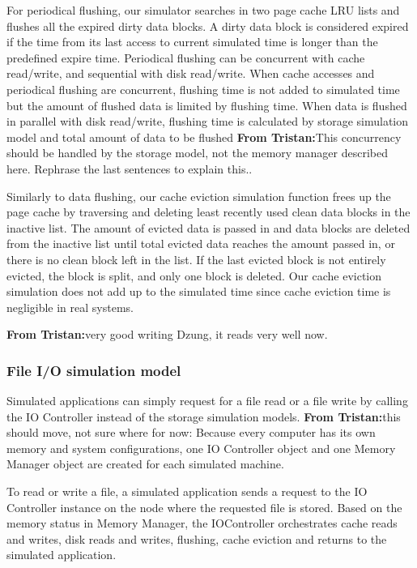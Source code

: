 \documentclass[conference]{IEEEtran}
\newcommand{\tristan}[1]{\color{orange}\textbf{From Tristan:}#1\color{black}}
\begin{document}
			For periodical flushing, our simulator searches in two page cache 
			LRU lists and flushes all the expired dirty data blocks. 
			A dirty data block is considered expired if the time from its last access 
			to current simulated time is longer than the predefined expire time. 
			Periodical flushing can be concurrent with cache read/write, 
			and sequential with disk read/write. When cache accesses and 
			periodical flushing are concurrent, flushing time is not added to simulated 
			time but the amount of flushed data is limited by flushing time. 
			When data is flushed in parallel with disk read/write, flushing time is 
			calculated by storage simulation model and total amount of data 
			to be flushed \tristan{This concurrency should be handled by the storage model, not the memory manager described here. 
			Rephrase the last sentences to explain this.}.
				
			Similarly to data flushing, our cache eviction simulation function frees up 
			the page cache by traversing and deleting least recently used clean 
			data blocks in the inactive list.
			The amount of evicted data is passed in and data blocks are deleted 
			from the inactive list until total evicted data reaches the amount 
			passed in, or there is no clean block left in the list.
			If the last evicted block is not entirely evicted, the block is split, 
			and only one block is deleted.
			Our cache eviction simulation does not add up to the simulated time 
			since cache eviction time is negligible in real systems.			
			
            \tristan{very good writing Dzung, it reads very well now.}

			\subsubsection{File I/O simulation model}			
			
			Simulated applications can simply request for a file read 
			or a file write by calling the IO Controller instead of 
			the storage simulation models. 
			\tristan{this should move, not sure where for now: Because every computer has its own memory and system configurations, 
			one IO Controller object and one Memory Manager object are created 
			for each simulated machine.}
			
			To read or write a file, a simulated application sends a request to the 
			IO Controller instance on the node where the requested file is stored.
			Based on the memory status in Memory Manager, the IOController 
			orchestrates cache reads and writes, disk reads and writes, flushing, cache eviction 
			 and returns to the simulated application.
			
\end{document}
